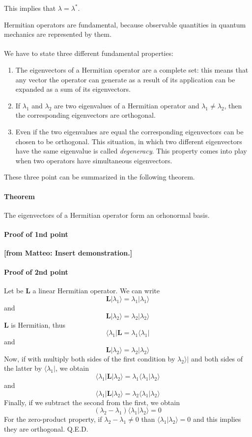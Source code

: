 \documentclass[a4paper,10pt]{article}
\newcommand{\from}[2]{{\bf[{\sc from #1:} #2]}}
\begin{document}
This implies that $\lambda = \lambda^*$.

Hermitian operators are fundamental, because observable quantities in quantum mechanics are represented by them. 

\paragraph{} We have to state three different fundamental properties:
\begin{enumerate}
    \item The eigenvectors of a Hermitian operator are a complete set: this means that any vector the operator can generate as a result of its application can be expanded as a sum of its eigenvectors.
    \item If $\lambda_1$ and $\lambda_2$ are two eigenvalues of a Hermitian operator and $\lambda_1 \neq \lambda_2$, then the corresponding eigenvectors are orthogonal.
    \item Even if the two eigenvalues are equal the corresponding eigenvectors can be chosen to be orthogonal. This situation, in which two different eigenvectors have the same eigenvalue is called \textit{degeneracy}. This property comes into play when two operators have simultaneous eigenvectors.
\end{enumerate}

These three point can be summarized in the following theorem.

\paragraph{Theorem} The eigenvectors of a Hermitian operator form an orhonormal basis.

\paragraph{Proof of 1nd point} \from{Matteo}{Insert demonstration.}

\paragraph{Proof of 2nd point} Let be $\mathbf{L}$ a linear Hermitian operator. We can write
$$\mathbf{L}|\lambda_1\rangle = \lambda_1|\lambda_1\rangle$$
and
$$\mathbf{L}|\lambda_2\rangle = \lambda_2|\lambda_2\rangle$$
$\mathbf{L}$ is Hermitian, thus
$$\langle\lambda_1|\mathbf{L} = \lambda_1\langle\lambda_1|$$
and
$$\mathbf{L}|\lambda_2\rangle = \lambda_2|\lambda_2\rangle$$
Now, if with multiply both sides of the first condition by $\lambda_2\rangle|$ and both sides of the latter by $\langle\lambda_1|$, we obtain
$$\langle\lambda_1|\mathbf{L}|\lambda_2\rangle = \lambda_1\langle\lambda_1|\lambda_2\rangle$$
and
$$\langle\lambda_1|\mathbf{L}|\lambda_2\rangle = \lambda_2\langle\lambda_1|\lambda_2\rangle$$
Finally, if we subtract the second from the first, we obtain
$$(\lambda_2-\lambda_1) \langle\lambda_1|\lambda_2\rangle = 0$$
For the zero-product property, if $\lambda_2-\lambda_1 \neq 0$ than $\langle\lambda_1|\lambda_2\rangle = 0$ and this implies they are orthogonal. Q.E.D.
\end{document}
